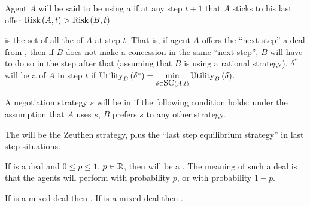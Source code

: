 \begin{defi}
Agent $A$ will be said to be using a  if at any step $t+1$ that $A$ sticks to his last offer $\mbox{Risk}\left(A,t\right)>\mbox{Risk}\left(B,t\right)$
\cite{conf/ijcai/ZlotkinR89}
\end{defi}

\begin{defi}
 is the set of all the  of $A$ at step $t$. That is, if agent $A$ offers the ``next step'' a deal from , then if $B$ does not make a concession in the same ``next step'', $B$ will have to do so in the step after that (assuming that $B$ is using a rational strategy). $\delta^*$ will be a  of $A$ in step $t$ if $\mbox{Utility}_B\left(\delta^*\right)=\displaystyle\min_{\delta\in\mbox{SC}\left(A,t\right)}\mbox{Utility}_B\left(\delta\right)$.
\cite{conf/ijcai/ZlotkinR89}
\end{defi}

\begin{defi}
A negotiation strategy $s$ will be in  if the following condition holds: under the assumption that $A$ uses $s$, $B$ prefers $s$ to any other strategy.
\cite{conf/ijcai/ZlotkinR89}
\end{defi}

\begin{defi}
The  will be the Zeuthen strategy, plus the ``last step equilibrium strategy'' in last step situations.
\cite{conf/ijcai/ZlotkinR89}
\end{defi}

\begin{defi}
If  is a deal and $0\leq p\leq 1$, $p\in\mathbb{R}$, then  will be a . The meaning of such a deal is that the agents will perform  with probability $p$, or  with probability $1-p$.
\cite{conf/ijcai/ZlotkinR89}
\end{defi}

\begin{defi}
If  is a mixed deal then . If  is a mixed deal then .
\cite{conf/ijcai/ZlotkinR89}
\end{defi}

